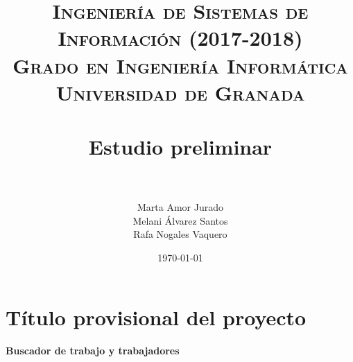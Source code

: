 


\title{	
\normalfont \normalsize 
\textsc{\textbf{Ingeniería de Sistemas de Información (2017-2018)} \\ Grado en Ingeniería Informática \\ Universidad de Granada} \\ [25pt] %
\horrule{0.5pt} \\[0.4cm] %
\huge Estudio preliminar \\ %
\horrule{2pt} \\[0.5cm]
}

\author{Marta Amor Jurado \\ Melani Álvarez Santos \\ Rafa Nogales Vaquero} %

\date{\normalsize\today} %



\maketitle
\newpage 
\tableofcontents
\newpage
\setlength{\parindent}{1cm}


\section{Título provisional del proyecto}

\begin{center}
	\textbf{Buscador de trabajo y trabajadores}
\end{center}



